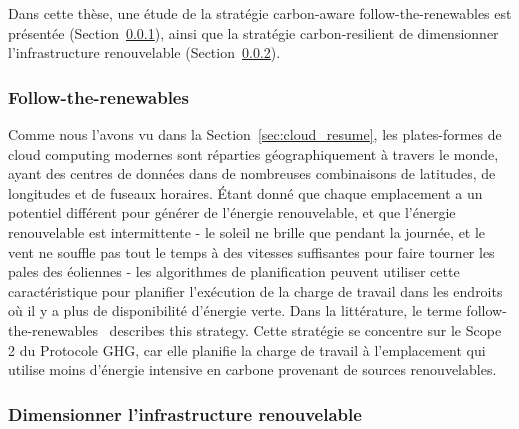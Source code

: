Dans cette thèse, une étude de la stratégie carbon-aware follow-the-renewables est présentée (Section~\ref{sec:followtherenewables_resume}), ainsi que la stratégie carbon-resilient de dimensionner l'infrastructure renouvelable (Section~\ref{sec:sizing_resume}).


\subsubsection{Follow-the-renewables}

\label{sec:followtherenewables_resume}

Comme nous l'avons vu dans la Section~\ref{sec:cloud_resume}, les plates-formes de cloud computing modernes sont réparties géographiquement à travers le monde, ayant des centres de données dans de nombreuses combinaisons de latitudes, de longitudes et de fuseaux horaires. Étant donné que chaque emplacement a un potentiel différent pour générer de l'énergie renouvelable, et que l'énergie renouvelable est intermittente - le soleil ne brille que pendant la journée, et le vent ne souffle pas tout le temps à des vitesses suffisantes pour faire tourner les pales des éoliennes - les algorithmes de planification peuvent utiliser cette caractéristique pour planifier l'exécution de la charge de travail dans les endroits où il y a plus de disponibilité d'énergie verte. Dans la littérature, le terme \guillemotleft follow-the-renewables\guillemotright~\cite{shuja2016sustainable} describes this strategy. Cette stratégie se concentre sur le Scope 2 du Protocole GHG, car elle planifie la charge de travail à l'emplacement qui utilise moins d'énergie intensive en carbone provenant de sources renouvelables.


\subsubsection{Dimensionner l'infrastructure renouvelable}


\label{sec:sizing_resume}


